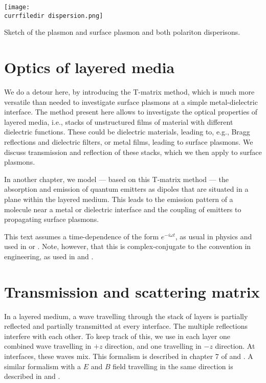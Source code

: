 \begin{marginfigure}
\texttt{[image: \\currfiledir dispersion.png]}
\caption{Sketch of the plasmon and surface plasmon and both polariton disperisons. \label{fig:surface_dispersions}}
\end{marginfigure}





\section{Optics of layered media}

We do a detour here, by introducing the T-matrix method, which is much more versatile than needed to investigate surface plasmons at a simple metal-dielectric interface. The method present here allows to  investigate the optical properties of layered media, i.e., stacks of unstructured   films of material with different dielectric functions. These could be dielectric materials, leading to, e.g., Bragg reflections and dielectric filters, or metal films, leading to surface plasmons. We discuss transmission and reflection of these stacks, which we then apply to surface plasmons.


In another chapter, we model --- based on this T-matrix method --- the absorption and emission of quantum emitters  as dipoles that are situated in a plane within the layered medium. This leads to the emission pattern of a molecule near a metal or dielectric interface and the coupling of emitters to propagating surface plasmons.

This text assumes a time-dependence of the form $e^{-i \omega t}$, as usual in physics and used in \cite{Novotny-Hecht2012} or \cite{BornWolf2002}. Note, however, that this is complex-conjugate to the convention in engineering, as used in \cite{SalehTeich1991} and \cite{Yeh2005}.


\section{Transmission and scattering matrix}


In a layered medium, a wave travelling through the stack of layers is  partially reflected and partially transmitted at every interface. The multiple reflections interfere with each other. To keep track of this, we use in each layer one combined wave travelling in $+z$ direction, and one travelling in $-z$ direction. At interfaces, these waves mix. This formalism is described in  chapter 7 of \cite{SalehTeich1991} and \cite{Yeh2005}. A similar formalism with a $E$ and $B$ field travelling in the same direction is described in \cite{Pedrotti2008} and \cite{Macleod2001}.

